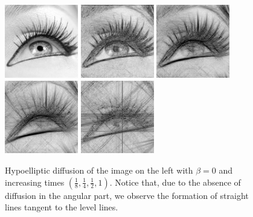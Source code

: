 \documentclass[proc]{edpsmath}
\begin{document}
\begin{figure}
  \includegraphics[height=3.2cm]{imgs/eye}\hfill
  \includegraphics[height=3.2cm]{imgs/eye-beta0-0}
  \includegraphics[height=3.2cm]{imgs/eye-beta0-1}
  \includegraphics[height=3.2cm]{imgs/eye-beta0-2}
  \includegraphics[height=3.2cm]{imgs/eye-beta0-3}
  \caption{Hypoelliptic diffusion of the image on the left with $\beta = 0$ and increasing times  $(\frac18,\frac14,\frac12,1)$. Notice that, due to the absence of diffusion in the angular part, we observe the formation of straight lines tangent to the level lines.}
  \label{fig:beta0}
\end{figure}
\end{document}
